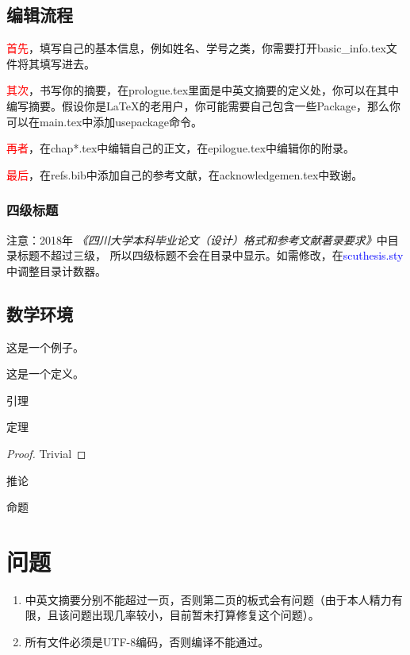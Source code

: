 	\subsection{编辑流程\label{procedure}}	%
	\textcolor{red}{首先}，填写自己的基本信息，例如姓名、学号之类，你需要打开basic\_info.tex文件将其填写进去。
	
	\textcolor{red}{其次}，书写你的摘要，在prologue.tex里面是中英文摘要的定义处，你可以在其中编写摘要。假设你是\LaTeX 的老用户，你可能需要自己包含一些Package，那么你可以在main.tex中添加usepackage命令。
	
	\textcolor{red}{再者}，在chap*.tex中编辑自己的正文，在epilogue.tex中编辑你的附录。
	
	\textcolor{red}{最后}，在refs.bib中添加自己的参考文献，在acknowledgemen.tex中致谢。
	
	
	
	\subsubsection{四级标题}
	注意：2018年 \textit{《四川大学本科毕业论文（设计）格式和参考文献著录要求》}中目录标题不超过三级，
	所以四级标题不会在目录中显示。如需修改，在\textcolor{blue}{scuthesis.sty}中调整目录计数器。
	
	\subsection{数学环境}
	
	\begin{exmp}
		这是一个例子。
	\end{exmp}

	\begin{defn} \label{test}
		这是一个定义。
	\end{defn} 
	
	\begin{lem}
		引理
	\end{lem}
	
	\begin{thm}
		定理
	\end{thm}
	
	\begin{proof}
		Trivial
	\end{proof}
	
	\begin{cor}
		推论
	\end{cor}

	\begin{prop}
		命题
	\end{prop}
	
	
	\section{问题}
	\begin{enumerate}
	\item 中英文摘要分别不能超过一页，否则第二页的板式会有问题（由于本人精力有限，且该问题出现几率较小，目前暂未打算修复这个问题）。
	\item 所有文件必须是UTF-8编码，否则编译不能通过。
	\end{enumerate}
